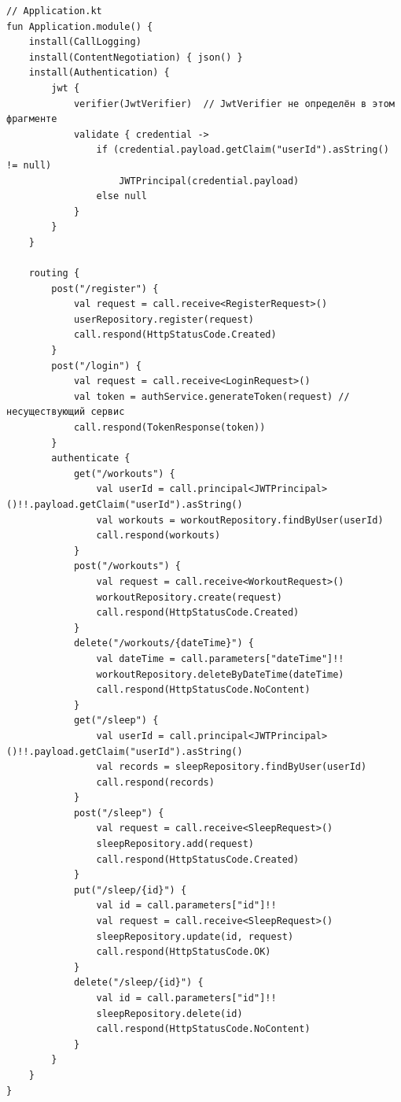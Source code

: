 \begin{lstlisting}[caption={Бэкенд: модуль Ktor с маршрутами (схема)}]
// Application.kt
fun Application.module() {
    install(CallLogging)
    install(ContentNegotiation) { json() }
    install(Authentication) {
        jwt {
            verifier(JwtVerifier)  // JwtVerifier не определён в этом фрагменте
            validate { credential ->
                if (credential.payload.getClaim("userId").asString() != null)
                    JWTPrincipal(credential.payload)
                else null
            }
        }
    }

    routing {
        post("/register") {
            val request = call.receive<RegisterRequest>()
            userRepository.register(request)      
            call.respond(HttpStatusCode.Created)
        }
        post("/login") {
            val request = call.receive<LoginRequest>()
            val token = authService.generateToken(request) // несуществующий сервис
            call.respond(TokenResponse(token))
        }
        authenticate {
            get("/workouts") {
                val userId = call.principal<JWTPrincipal>()!!.payload.getClaim("userId").asString()
                val workouts = workoutRepository.findByUser(userId) 
                call.respond(workouts)
            }
            post("/workouts") {
                val request = call.receive<WorkoutRequest>()
                workoutRepository.create(request)   
                call.respond(HttpStatusCode.Created)
            }
            delete("/workouts/{dateTime}") {
                val dateTime = call.parameters["dateTime"]!!
                workoutRepository.deleteByDateTime(dateTime) 
                call.respond(HttpStatusCode.NoContent)
            }
            get("/sleep") {
                val userId = call.principal<JWTPrincipal>()!!.payload.getClaim("userId").asString()
                val records = sleepRepository.findByUser(userId) 
                call.respond(records)
            }
            post("/sleep") {
                val request = call.receive<SleepRequest>()
                sleepRepository.add(request)        
                call.respond(HttpStatusCode.Created)
            }
            put("/sleep/{id}") {
                val id = call.parameters["id"]!!
                val request = call.receive<SleepRequest>()
                sleepRepository.update(id, request) 
                call.respond(HttpStatusCode.OK)
            }
            delete("/sleep/{id}") {
                val id = call.parameters["id"]!!
                sleepRepository.delete(id)           
                call.respond(HttpStatusCode.NoContent)
            }
        }
    }
}
\end{lstlisting}

